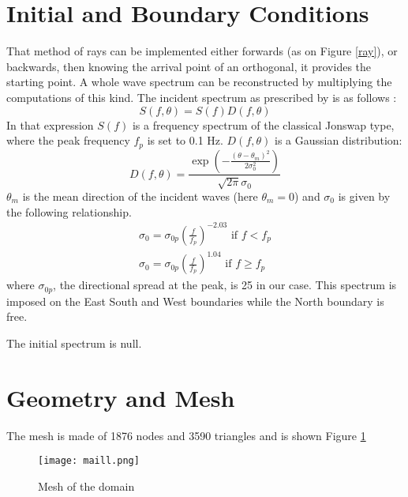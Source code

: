 \section{Initial and Boundary Conditions}

That method of rays can be implemented  either forwards (as on Figure
\ref{ray}), or backwards, then knowing the arrival point of an orthogonal, it
provides the starting point. A whole wave spectrum can be reconstructed by
multiplying the computations of this kind. The incident spectrum as prescribed
by \cite{Mathiesen1987} is as follows :
$$
S(f,\theta)=S(f)D(f,\theta)
$$
In that expression $S(f)$ is a frequency spectrum of the classical Jonswap type, where the peak frequency $f_p$ is set to 0.1 Hz.
$D(f,\theta)$ is a Gaussian distribution:
$$
D(f,\theta)=\frac{\exp\left(-\frac{(\theta-\theta_m)^2}{2\sigma_0^2} \right)}{\sqrt{2\pi}\sigma_0}
$$
$\theta_m$ is the mean direction of the incident waves (here $\theta_m=0$) and
$\sigma_0$ is given by the following relationship.
$$
\left.
\begin{array}{ll}
\sigma_0= \sigma_{0p}\left(\frac{f}{f_p}\right)^{-2.03}\mbox{ if }f<f_p \\[6pt]
\sigma_0= \sigma_{0p}\left(\frac{f}{f_p}\right)^{1.04}\mbox{ if } f \ge f_p
\end{array}
\right.
$$
where $\sigma_{0p}$, the directional spread at the peak, is 25 in our case.
This spectrum is imposed on the East South and West boundaries while the North boundary is free.

The initial spectrum is null.
%

%
%
%
%
\section{Geometry and Mesh}
%
The mesh is made of 1876 nodes and 3590 triangles and is shown Figure \ref{mail}
\begin{figure} [H]
\centering
\texttt{[image: maill.png]}
 \caption{Mesh of the domain}
\label{mail}
\end{figure}

